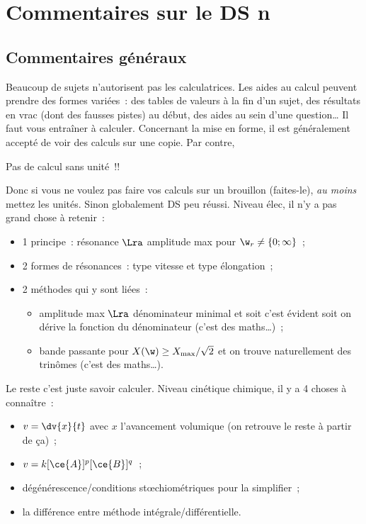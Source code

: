 \documentclass[a4paper, 12pt, final, garamond]{book}
\begin{document}
\setcounter{chapter}{3}

\chapter{Commentaires sur le DS n}

\section{Commentaires généraux}
Beaucoup de sujets n'autorisent pas les calculatrices. Les aides au calcul
peuvent prendre des formes variées~: des tables de valeurs à la fin d'un sujet,
des résultats en vrac (dont des fausses pistes) au début, des aides au sein
d'une question… Il faut vous entraîner à calculer.
Concernant la mise en forme, il est généralement accepté de voir des calculs sur
une copie. Par contre,
\begin{center}
	\Large
	Pas de calcul sans unité~!!
\end{center}
Donc si vous ne voulez pas faire vos calculs sur un brouillon (faites-le),
\textit{au moins} mettez les unités.
Sinon globalement DS peu réussi. Niveau élec, il n'y a pas grand chose à
retenir~:
\begin{itemize}
	\item 1 principe~: résonance $\Lra$ amplitude max pour $\w_r \neq \{0;\infty\}$~;
	\item 2 formes de résonances~: type vitesse et type élongation~;
	\item 2 méthodes qui y sont liées~:
	      \begin{itemize}
		      \item amplitude max $\Lra$ dénominateur minimal et soit c'est évident soit
		            on dérive la fonction du dénominateur (c'est des maths…)~;
		      \item bande passante pour $X (\w) \geq X_{\max}/\sqrt{2}$ et on trouve
		            naturellement des trinômes (c'est des maths…).
	      \end{itemize}
\end{itemize}
Le reste c'est juste savoir calculer.
Niveau cinétique chimique, il y a 4 choses à connaître~:
\begin{itemize}
	\item $v = \dv{x}{t}$ avec $x$ l'avancement volumique (on retrouve le reste à
	      partir de ça)~;
	\item $v = k[\ce{A}]^{p}[\ce{B}]^{q}$~;
	\item dégénérescence/conditions stœchiométriques pour la simplifier~;
	\item la différence entre méthode intégrale/différentielle.
\end{itemize}
\end{document}
